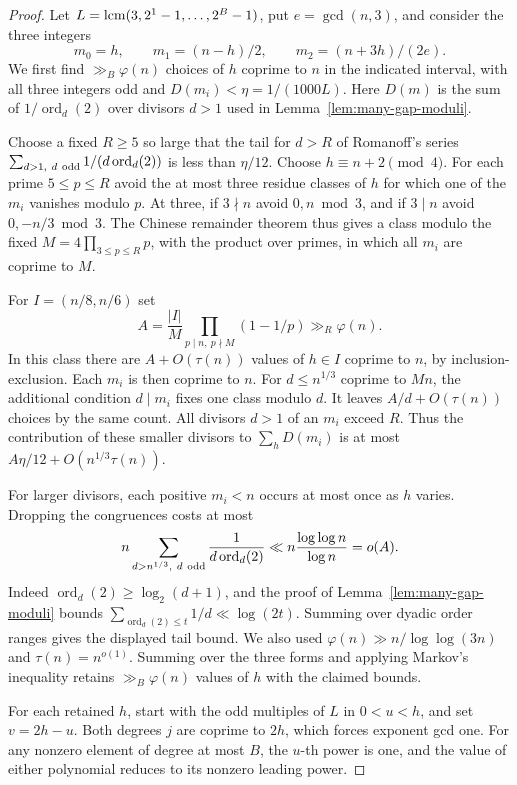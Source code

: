 \documentclass[11pt]{article}
\newcommand{\ord}{\operatorname{ord}}
\begin{document}
\begin{proof}
Let \(L=\mathop{\rm lcm}(3,2^1-1,\ldots,2^B-1)\), put
\(e=\gcd(n,3)\), and consider the three integers
\[
 m_0=h,\qquad m_1=(n-h)/2,\qquad m_2=(n+3h)/(2e).
\]
We first find \(\gg_B\varphi(n)\) choices of \(h\) coprime to \(n\)
in the indicated interval, with all three integers odd and
\(D(m_i)<\eta=1/(1000L)\). Here \(D(m)\) is the sum of
\(1/\ord_d(2)\) over divisors \(d>1\) used in
Lemma~\ref{lem:many-gap-moduli}.

Choose a fixed \(R\ge5\) so large that the tail for \(d>R\) of
Romanoff's series \(\sum_{d>1,\ d\ {\rm odd}}1/(d\ord_d(2))\)
is less than \(\eta/12\). Choose \(h\equiv n+2\pmod4\). For each
prime \(5\le p\le R\) avoid the at most three residue classes of
\(h\) for which one of the \(m_i\) vanishes modulo \(p\).
At three, if \(3\nmid n\) avoid \(0,n\bmod3\), and if \(3\mid n\)
avoid \(0,-n/3\bmod3\). The Chinese remainder theorem thus gives
a class modulo the fixed \(M=4\prod_{3\le p\le R}p\), with the
product over primes, in which all \(m_i\) are coprime to \(M\).

For \(I=(n/8,n/6)\) set
\[
 A=\frac{|I|}{M}\prod_{p\mid n,\ p\nmid M}(1-1/p)\gg_R\varphi(n).
\]
In this class there are \(A+O(\tau(n))\) values of \(h\in I\)
coprime to \(n\), by inclusion-exclusion. Each \(m_i\) is then
coprime to \(n\). For \(d\le n^{1/3}\) coprime to \(Mn\),
the additional condition \(d\mid m_i\) fixes one class modulo \(d\).
It leaves \(A/d+O(\tau(n))\) choices by the same count.
All divisors \(d>1\) of an \(m_i\) exceed \(R\). Thus the contribution
of these smaller divisors to \(\sum_h D(m_i)\) is at most
\(A\eta/12+O(n^{1/3}\tau(n))\).

For larger divisors, each positive \(m_i<n\) occurs at most once as
\(h\) varies. Dropping the congruences costs at most
\[
 n\sum_{d>n^{1/3},\ d\ {\rm odd}}\frac1{d\ord_d(2)}
       \ll n\frac{\log\log n}{\log n}=o(A).
\]
Indeed \(\ord_d(2)\ge\log_2(d+1)\), and the proof of
Lemma~\ref{lem:many-gap-moduli} bounds
\(\sum_{\ord_d(2)\le t}1/d\ll\log(2t)\). Summing over dyadic
order ranges gives the displayed tail bound. We also used
\(\varphi(n)\gg n/\log\log(3n)\) and \(\tau(n)=n^{o(1)}\).
Summing over the three forms and applying Markov's inequality
retains \(\gg_B\varphi(n)\) values of \(h\) with the claimed bounds.

For each retained \(h\), start with the odd multiples of \(L\) in
\(0<u<h\), and set \(v=2h-u\). Both degrees \(j\) are coprime
to \(2h\), which forces exponent gcd one. For any nonzero element
of degree at most \(B\), the \(u\)-th power is one, and the value of
either polynomial reduces to its nonzero leading power.


\end{proof}
\end{document}

